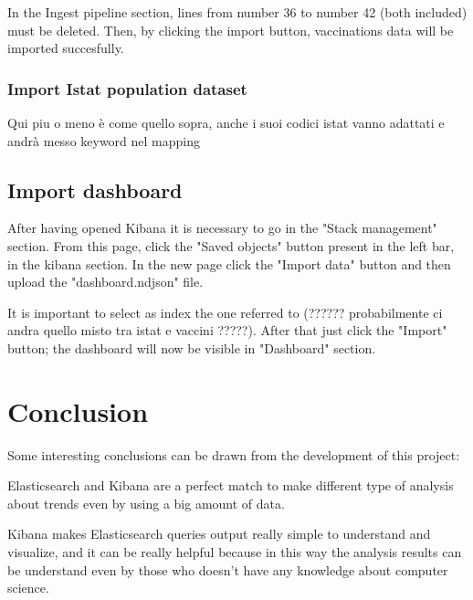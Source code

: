 \documentclass{article}
\begin{document}
In the Ingest pipeline section, lines from number 36 to number 42 (both included) must be deleted.
Then, by clicking the import button, vaccinations data will be imported succesfully.

\subsubsection{Import Istat population dataset}
Qui piu o meno è come quello sopra, anche i suoi codici istat vanno adattati e andrà messo keyword nel mapping

\subsection{Import dashboard}
After having opened Kibana it is necessary to go in the {\selectfont"Stack management"} section. From this page, click the {\selectfont"Saved objects"} button present in the left bar, in the kibana section. In the new page click the {\selectfont"Import data"} button and then upload the {\selectfont"dashboard.ndjson"} file. 

It is important to select as index the one referred to (?????? probabilmente ci andra quello misto tra istat e vaccini ?????).
After that just click the {\selectfont"Import"} button; the dashboard will now be visible in {\selectfont"Dashboard"} section.

\newpage

\section{Conclusion}

Some interesting conclusions can be drawn from the development of this project:

Elasticsearch and Kibana are a perfect match to make different type of analysis about trends even by using a big amount of data.

Kibana makes Elasticsearch queries output really simple to understand and visualize, and it can be really helpful because in this way the analysis results can be understand even by those who doesn't have any knowledge about computer science.
\end{document}

